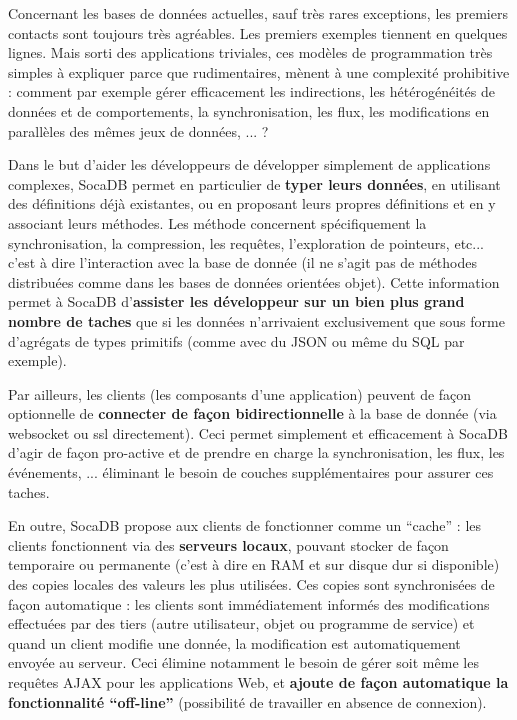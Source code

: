 \documentclass[a4paper,10pt]{scrreprt}
\begin{document}
            Concernant les bases de données actuelles, sauf très rares exceptions, les premiers contacts sont toujours très agréables. Les premiers exemples tiennent en quelques lignes. Mais sorti des applications triviales, ces modèles de programmation très simples à expliquer parce que rudimentaires, mènent à une complexité prohibitive : comment par exemple gérer efficacement les indirections, les hétérogénéités de données et de comportements, la synchronisation, les flux, les modifications en parallèles des mêmes jeux de données, ... ?
            
            
            Dans le but d'aider les développeurs de développer simplement de applications complexes, SocaDB permet en particulier de \textbf{typer leurs données}, en utilisant des définitions déjà existantes, ou en proposant leurs propres définitions et en y associant leurs méthodes. Les méthode concernent spécifiquement la synchronisation, la compression, les requêtes, l'exploration de pointeurs, etc... c'est à dire l'interaction avec la base de donnée (il ne s'agit pas de méthodes distribuées comme dans les bases de données orientées objet). Cette information permet à SocaDB d'\textbf{assister les développeur sur un bien plus grand nombre de taches} que si les données n'arrivaient exclusivement que sous forme d'agrégats de types primitifs (comme avec du JSON ou même du SQL par exemple). %
            
            \medskip
            Par ailleurs, les clients (les composants d'une application) peuvent de façon optionnelle de \textbf{connecter de façon bidirectionnelle} à la base de donnée (via websocket ou ssl directement). Ceci permet simplement et efficacement à SocaDB d'agir de façon pro-active et de prendre en charge la synchronisation, les flux, les événements, ... éliminant le besoin de couches supplémentaires pour assurer ces taches.
            
            En outre, SocaDB propose aux clients de fonctionner comme un ``cache'' : les clients fonctionnent via des \textbf{serveurs locaux}, pouvant stocker de façon temporaire ou permanente (c'est à dire en RAM et sur disque dur si disponible) des copies locales des valeurs les plus utilisées. Ces copies sont synchronisées de façon automatique : les clients sont immédiatement informés des modifications effectuées par des tiers (autre utilisateur, objet ou programme de service) et quand un client modifie une donnée, la modification est automatiquement envoyée au serveur. Ceci élimine notamment le besoin de gérer soit même les requêtes AJAX pour les applications Web, et \textbf{ajoute de façon automatique la fonctionnalité ``off-line''} (possibilité de travailler en absence de connexion).
\end{document}
